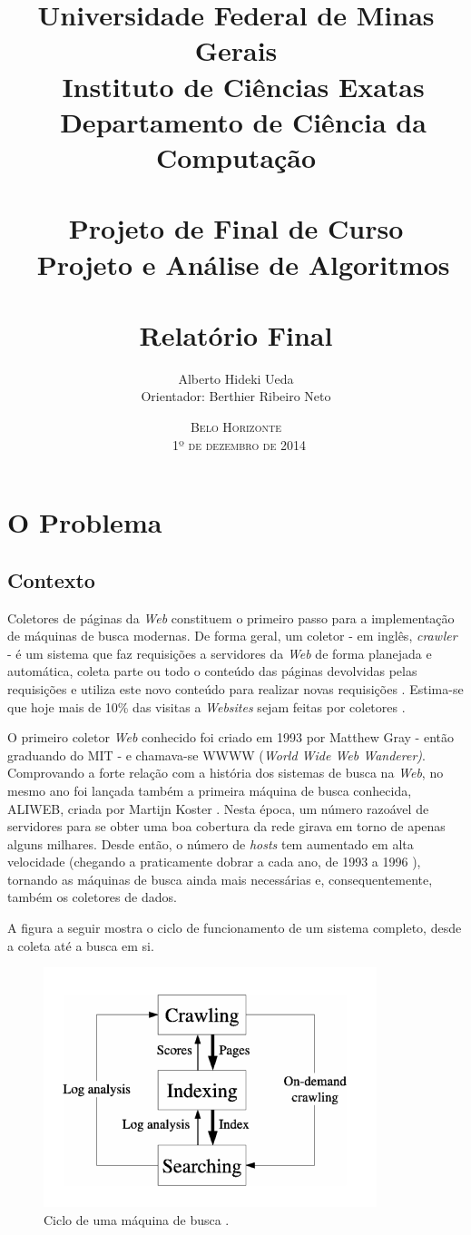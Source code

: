 \documentclass[a4paper,12pt,titlepage]{article}
\title{\large
Universidade Federal de Minas Gerais \\ \
Instituto de Ciências Exatas \\ \ 
Departamento de Ciência da Computação \\ \
\\[1cm]
Projeto de Final de Curso\\ \
Projeto e Análise de Algoritmos\\ \
\\[1cm]
\textbf{\Large Relatório Final }
\\[1cm]
}
\author{\large Alberto Hideki Ueda \\[0.5cm] 
	Orientador: Berthier Ribeiro Neto 
\\[3cm] }
\date{\textsc{Belo Horizonte\\ \
1º de dezembro de 2014}}
\begin{document}
\maketitle

\pagebreak
\tableofcontents
\pagebreak

\section {O Problema}

\subsection{Contexto}

Coletores de páginas da \textit{Web} constituem o primeiro passo para a implementação de máquinas de busca modernas. De forma geral, um coletor - em inglês, \textit{crawler} - é um sistema que faz requisições a servidores da \textit{Web} de forma planejada e automática, coleta parte ou todo o conteúdo das páginas devolvidas pelas requisições e utiliza este novo conteúdo para realizar novas requisições \cite{b}. Estima-se que hoje mais de 10\% das visitas a \textit{Websites} sejam feitas por coletores \cite{nielsen}.

O primeiro coletor \textit{Web} conhecido foi criado em 1993 por Matthew Gray - então graduando do MIT - e chamava-se WWWW (\textit{World Wide Web Wanderer)}. Comprovando a forte relação com a história dos sistemas de busca na \textit{Web}, no mesmo ano foi lançada também a primeira máquina de busca conhecida, ALIWEB, criada por Martijn Koster \cite{b}. Nesta época, um número razoável de servidores para se obter uma boa cobertura da rede girava em torno de apenas alguns milhares. Desde então, o número de \textit{hosts} tem aumentado em alta velocidade  (chegando a praticamente dobrar a cada ano, de 1993 a 1996 \cite{gray}), tornando as máquinas de busca ainda mais necessárias e, consequentemente, também os coletores de dados.

A figura a seguir mostra o ciclo de funcionamento de um sistema completo, desde a coleta até a busca em si.

\begin{figure}[H]
     \centering
     \includegraphics[scale=0.6]{figures/search-engine-cycle.png}
     \caption{Ciclo de uma máquina de busca \cite{carlos}.}
     \label{bsp}
\end{figure}
\end{document}
